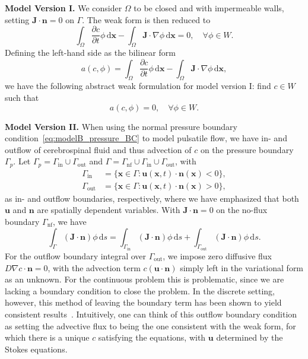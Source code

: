 \documentclass[fleqn]{wlscirep}
\newcommand{\pdifft}[1]{\frac{\partial  #1}{\partial t}}
\newcommand{\intO}[1]{\int_{\Omega}#1 \, \mathrm d\bm{x}}
\newcommand{\intG}[1]{\int_{\Gamma}#1 \, \mathrm ds}
\newcommand{\intGin}[1]{\int_{\Gamma_{\mathrm{in}}}#1 \, \mathrm ds}
\newcommand{\intGout}[1]{\int_{\Gamma_{\mathrm{out}}}#1 \, \mathrm ds}
\newcommand{\Gp}{\Gamma_{p}}
\newcommand{\Gnf}{\Gamma_{\mathrm{nf}}}
\newcommand{\Gin}{\Gamma_{\mathrm{in}}}
\newcommand{\Gout}{\Gamma_{\mathrm{out}}}
\newcommand{\nn}{\mathbf{n}}
\newcommand{\uu}{\mathbf{u}}
\newcommand{\xx}{\bm{x}}
\newcommand{\JJ}{\mathbf{J}}
\begin{document}
\textbf{Model Version I.} We consider $\Omega$ to be closed and with impermeable walls, setting $\JJ\cdot\nn=0$ on $\Gamma$. The weak form is then reduced to
\begin{equation*}
    \intO{\pdifft{c}\phi} - \intO{\JJ\cdot\nabla\phi} = 0, \quad\forall\phi\in W.
\end{equation*}
Defining the left-hand side as the bilinear form
\begin{equation*}
    a(c, \phi) = \intO{\pdifft{c}\phi} - \intO{\JJ\cdot\nabla\phi}, 
\end{equation*}
we have the following abstract weak formulation for model version I: find $c\in W$ such that
\begin{equation*}
    a(c, \phi) = 0, \quad\forall\phi\in W. %
\end{equation*}

\textbf{Model Version II.} When using the normal pressure boundary condition~\eqref{eq:modelB_pressure_BC} to model pulsatile flow, we have in- and outflow of cerebrospinal fluid and thus advection of $c$ on the pressure boundary $\Gp$. Let $\Gp=\Gin\cup\Gout$ and $\Gamma = \Gnf\cup\Gin\cup\Gout$, with 
\begin{align*}
    \Gin  &= \bigg\{\xx\in\Gamma : \uu(\xx, t)\cdot\nn(\xx) < 0 \bigg\}, \\
    \Gout &= \bigg\{\xx\in\Gamma : \uu(\xx, t)\cdot\nn(\xx) > 0 \bigg\},
\end{align*}
as in- and outflow boundaries, respectively, where we have emphasized that both $\uu$ and $\nn$ are spatially dependent variables. With $\JJ\cdot\nn=0$ on the no-flux boundary $\Gnf$, we have
\begin{equation*}
    \intG{(\JJ\cdot\nn)\phi} = \intGin{(\JJ\cdot\nn)\phi} + \intGout{(\JJ\cdot\nn)\phi}. 
\end{equation*}
For the outflow boundary integral over $\Gout$, we impose zero diffusive flux $D\nabla c\cdot\nn=0$, with the advection term $c(\uu\cdot\nn)$ simply left in the variational form as an unknown. For the continuous problem this is problematic, since we are lacking a boundary condition to close the problem. In the discrete setting, however, this method of leaving the boundary term has been shown to yield consistent results~\cite{Papanastasiou1992ACondition, Lynch2020NumericalHemodynamics, Griffiths1997TheCondition}. Intuitively, one can think of this outflow boundary condition as setting the advective flux to being the one consistent with the weak form, for which there is a unique $c$ satisfying the equations, with $\uu$ determined by the Stokes equations. 
\end{document}
